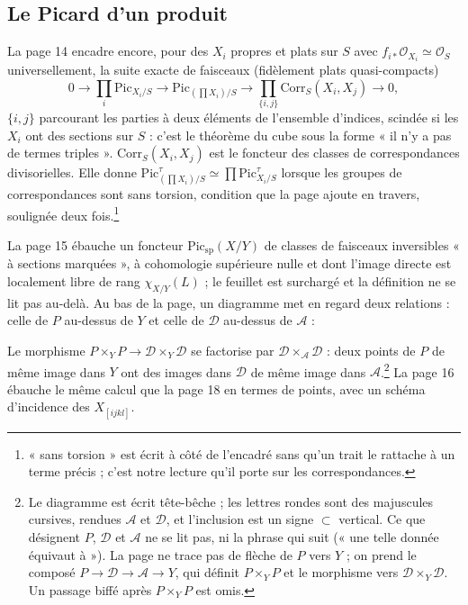 \documentclass[11pt,a4paper]{article}
\begin{document}
\subsection*{Le Picard d'un produit}

La page 14 encadre encore, pour des $X_i$ propres et plats sur $S$ avec
$f_{i*}\mathcal{O}_{X_i} \simeq \mathcal{O}_S$ universellement, la suite exacte
de faisceaux (fidèlement plats quasi-compacts)
\[
0 \to \prod_i \mathrm{Pic}_{X_i/S} \longrightarrow \mathrm{Pic}_{(\prod X_i)/S} \longrightarrow \prod_{\{i,j\}} \mathrm{Corr}_S(X_i, X_j) \to 0 ,
\]
$\{i, j\}$ parcourant les parties à deux éléments de l'ensemble d'indices,
scindée si les $X_i$ ont des sections sur $S$ : c'est le théorème du cube sous
la forme « il n'y a pas de termes triples ». $\mathrm{Corr}_S(X_i, X_j)$ est
le foncteur des classes de correspondances divisorielles. Elle donne
$\mathrm{Pic}^\tau_{(\prod X_i)/S} \simeq \prod \mathrm{Pic}^\tau_{X_i/S}$
lorsque les groupes de correspondances sont sans torsion, condition que la
page ajoute en travers, soulignée deux fois.\footnote{« sans torsion » est
écrit à côté de l'encadré sans qu'un trait le rattache à un terme précis ;
c'est notre lecture qu'il porte sur les correspondances.}

La page 15 ébauche un foncteur $\mathrm{Pic}_{\mathrm{sp}}(X/Y)$ de classes de
faisceaux inversibles « à sections marquées », à cohomologie supérieure nulle
et dont l'image directe est localement libre de rang
$\chi_{X/Y}(L)$ ; le feuillet est surchargé et la définition ne se lit pas
au-delà. Au bas de la page, un diagramme met en regard deux relations :
celle de $P$ au-dessus de $Y$ et celle de $\mathcal{D}$ au-dessus de
$\mathcal{A}$ :


Le morphisme $P \times_Y P \to \mathcal{D} \times_Y \mathcal{D}$ se
factorise par $\mathcal{D} \times_{\mathcal{A}} \mathcal{D}$ : deux points de
$P$ de même image dans $Y$ ont des images dans $\mathcal{D}$ de même image
dans $\mathcal{A}$.\footnote{Le diagramme est écrit tête-bêche ; les lettres
rondes sont des majuscules cursives, rendues $\mathcal{A}$ et $\mathcal{D}$,
et l'inclusion est un signe $\subset$ vertical. Ce que désignent $P$,
$\mathcal{D}$ et $\mathcal{A}$ ne se lit pas, ni la phrase qui suit
(« une telle donnée équivaut à »). La page ne trace pas de flèche de $P$
vers $Y$ ; on prend le composé $P \to \mathcal{D} \to \mathcal{A} \to Y$,
qui définit $P \times_Y P$ et le morphisme vers $\mathcal{D} \times_Y
\mathcal{D}$. Un passage biffé après $P \times_Y P$ est omis.} La page 16 ébauche le même calcul que la page 18 en termes de
points, avec un schéma d'incidence des $X_{[ijkl]}$.
\end{document}
